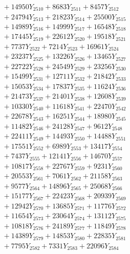 \documentclass[a4paper,10pt]{article}
\begin{document}
{\begin{align}
&\;  + 14950 Y_{2510} + 8683 Y_{2511} + 8457 Y_{2512} \\[0.3ex]
&\;  + 24794 Y_{2513} + 21823 Y_{2514} + 25500 Y_{2515} \\[0.3ex]
&\;  + 14989 Y_{2516} + 14999 Y_{2517} + 16548 Y_{2518} \\[0.5ex]\allowbreak
&\;  + 17445 Y_{2519} + 22612 Y_{2520} + 19518 Y_{2521} \\[0.3ex]
&\;  + 7737 Y_{2522} + 7214 Y_{2523} + 16961 Y_{2524} \\[0.3ex]
&\;  + 23237 Y_{2525} + 13226 Y_{2526} + 13465 Y_{2527} \\[0.3ex]
&\;  + 22722 Y_{2528} + 24549 Y_{2529} + 23256 Y_{2530} \\[0.3ex]
&\;  + 15499 Y_{2531} + 12711 Y_{2532} + 21842 Y_{2533} \\[0.3ex]
&\;  + 15053 Y_{2534} + 17837 Y_{2535} + 11624 Y_{2536} \\[0.3ex]
&\;  + 21473 Y_{2537} + 21401 Y_{2538} + 12608 Y_{2539} \\[0.3ex]
&\;  + 10330 Y_{2540} + 11618 Y_{2541} + 22470 Y_{2542} \\[0.3ex]
&\;  + 22678 Y_{2543} + 16251 Y_{2544} + 18980 Y_{2545} \\[0.3ex]
&\;  + 11482 Y_{2546} + 24128 Y_{2547} + 9612 Y_{2548} \\[0.5ex]\allowbreak
&\;  + 22411 Y_{2549} + 14493 Y_{2550} + 14488 Y_{2551} \\[0.3ex]
&\;  + 17551 Y_{2552} + 6989 Y_{2553} + 13417 Y_{2554} \\[0.3ex]
&\;  + 7437 Y_{2555} + 12141 Y_{2556} + 14670 Y_{2557} \\[0.3ex]
&\;  + 10817 Y_{2558} + 22767 Y_{2559} + 9231 Y_{2560} \\[0.3ex]
&\;  + 20553 Y_{2561} + 7061 Y_{2562} + 21158 Y_{2563} \\[0.3ex]
&\;  + 9577 Y_{2564} + 14896 Y_{2565} + 25068 Y_{2566} \\[0.3ex]
&\;  + 15177 Y_{2567} + 22423 Y_{2568} + 20939 Y_{2569} \\[0.3ex]
&\;  + 12942 Y_{2570} + 13685 Y_{2571} + 11776 Y_{2572} \\[0.3ex]
&\;  + 11654 Y_{2573} + 23064 Y_{2574} + 13112 Y_{2575} \\[0.3ex]
&\;  + 10818 Y_{2576} + 24189 Y_{2577} + 11849 Y_{2578} \\[0.5ex]\allowbreak
&\;  + 14389 Y_{2579} + 14853 Y_{2580} + 22835 Y_{2581} \\[0.3ex]
&\;  + 7795 Y_{2582} + 7331 Y_{2583} + 22096 Y_{2584} \\[0.3ex]

\end{align}}
\end{document}
